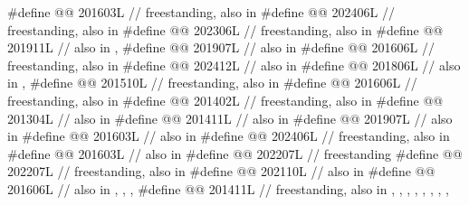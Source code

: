 \begin{codeblock}
#define @@                      201603L // freestanding, also in 
#define @@                202406L // freestanding, also in 
#define @@                202306L // freestanding, also in 
#define @@                           201911L // also in , 
#define @@                             201907L // also in 
#define @@                           201606L // freestanding, also in 
#define @@                            202412L // also in 
#define @@           201806L // also in , 
#define @@                    201510L // freestanding, also in 
#define @@                   201606L // freestanding, also in 
#define @@             201402L // freestanding, also in 
#define @@                       201304L // also in 
#define @@                   201411L // also in 
#define @@                    201907L // also in 
#define @@            201603L // also in 
#define @@                            202406L // freestanding, also in 
#define @@                   201603L // also in 
#define @@                           202207L // freestanding
#define @@             202207L // freestanding, also in 
#define @@                202110L // also in 
#define @@                      201606L
  // also in , , , 
#define @@        201411L
  // freestanding, also in , , , , , , , ,

\end{codeblock}
